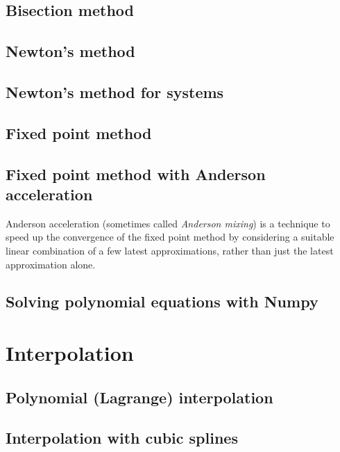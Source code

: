 \documentclass{article}
\begin{document}
\subsection{Bisection method}



\subsection{Newton's method}


\subsection{Newton's method for systems}


\subsection{Fixed point method}


\subsection{Fixed point method with Anderson acceleration}

Anderson acceleration (sometimes called {\em Anderson mixing}) is a technique
to speed up the convergence of the fixed point method by considering 
a suitable linear combination of a few latest approximations, rather than 
just the latest approximation alone. 





\subsection{Solving polynomial equations with Numpy}





\section{Interpolation}





\subsection{Polynomial (Lagrange) interpolation}




\subsection{Interpolation with cubic splines}
\end{document}
